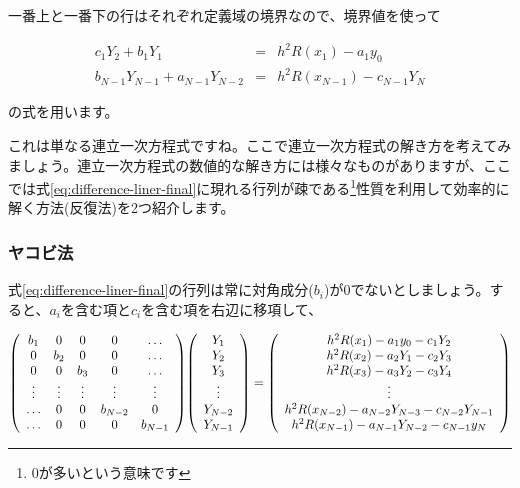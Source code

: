 一番上と一番下の行はそれぞれ定義域の境界なので、境界値を使って

\begin{eqnarray}
    c_1Y_2+b_1Y_1&=&h^2R(x_1)-a_1y_0 \\
    b_{N-1}Y_{N-1}+a_{N-1}Y_{N-2}&=&h^2R(x_{N-1})-c_{N-1}Y_N
\end{eqnarray}

\noindent
の式を用います。

これは単なる連立一次方程式ですね。ここで連立一次方程式の解き方を考えてみましょう。連立一次方程式の数値的な解き方には様々なものがありますが、ここでは式\ref{eq:difference-liner-final}に現れる行列が疎である\footnote{0が多いという意味です}性質を利用して効率的に解く方法(反復法)を2つ紹介します。







\subsubsection{ヤコビ法}
\label{jacobian}
式\ref{eq:difference-liner-final}の行列は常に対角成分($b_i$)が0でないとしましょう。すると、$a_i$を含む項と$c_i$を含む項を右辺に移項して、

\begin{eqnarray}
    \pqty{\begin{array}{ccccc}
        b_1 & 0 & 0 & 0 & \hdots \\
        0 & b_2 & 0 & 0 & \hdots \\
        0 & 0 & b_3 & 0 & \hdots \\
        \vdots & \vdots & \vdots & \vdots & \vdots \\
        \hdots & 0 & 0 & b_{N-2} & 0 \\
        \hdots & 0 & 0 & 0 & b_{N-1}
    \end{array}}
    \pqty{\begin{array}{c}
        Y_1 \\
        Y_2 \\
        Y_3 \\
        \vdots \\
        Y_{N-2} \\
        Y_{N-1}
    \end{array}}
    =\pqty{\begin{array}{c}
        h^2R(x_1)-a_1y_0-c_1Y_2 \\
        h^2R(x_2)-a_2Y_1-c_2Y_3 \\
        h^2R(x_3)-a_3Y_2-c_3Y_4 \\
        \vdots \\
        h^2R(x_{N-2})-a_{N-2}Y_{N-3}-c_{N-2}Y_{N-1} \\
        h^2R(x_{N-1})-a_{N-1}Y_{N-2}-c_{N-1}y_N
    \end{array}}
\end{eqnarray}

